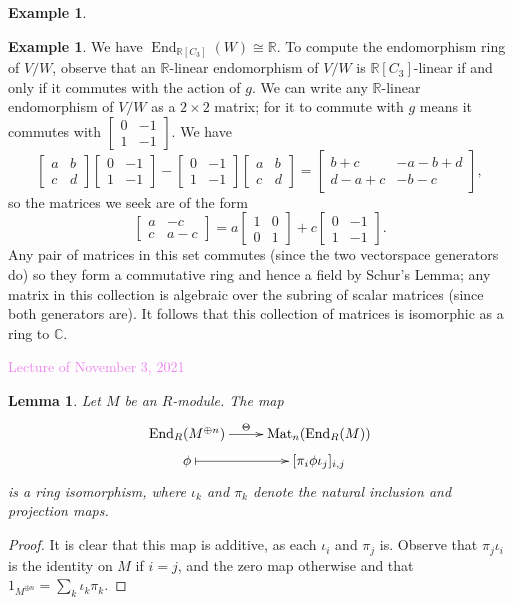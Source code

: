 \documentclass{amsart}[12pt]
\def\End{\operatorname{End}}
\def\Mat{\operatorname{Mat}}
\newcommand{\Nov}[1]{\textcolor{violet}{Lecture of November #1, 2021}}
\newcommand{\R}{{\mathbb{R}}}
\newcommand{\C}{\mathbb{C}}
\numberwithin{equation}{section}
\theoremstyle{plain} %
\newtheorem{lem}[equation]{Lemma}
\theoremstyle{definition}
\newtheorem{ex}[equation]{Example}
\theoremstyle{remark}
\begin{document}
\begin{ex}
\begin{ex}
We have $\End_{\R[C_3]}(W) \cong \R$. To compute the endomorphism ring of $V/W$, observe that an $\R$-linear endomorphism of $V/W$ is $\R[C_3]$-linear if and only if it commutes with the action of $g$. We can write any $\R$-linear endomorphism of $V/W$ as a $2\times 2$ matrix; for it to commute with $g$ means it commutes with $\begin{bmatrix} 0  & -1 \\ 1 & -1\end{bmatrix}$. We have 
\[ \begin{bmatrix} a & b \\ c& d \end{bmatrix} \begin{bmatrix} 0  & -1 \\ 1 & -1\end{bmatrix} - \begin{bmatrix} 0  & -1 \\ 1 & -1\end{bmatrix}  \begin{bmatrix} a & b \\ c& d \end{bmatrix} = \begin{bmatrix} b + c & -a-b+d \\ d -a + c & -b-c \end{bmatrix}, \]
so the matrices we seek are of the form \[\begin{bmatrix} a & -c \\ c & a-c \end{bmatrix}= a \begin{bmatrix} 1 & 0 \\ 0 & 1\end{bmatrix} + c \begin{bmatrix} 0 & -1 \\ 1 & -1\end{bmatrix}. \] Any pair of matrices in this set commutes (since the two vectorspace generators do) so they form a commutative ring and hence a field by Schur's Lemma;  any matrix in this collection is algebraic over the subring of scalar matrices (since both generators are). It follows that this collection of matrices is isomorphic as a ring to $\C$. \end{ex}

\Nov{3}

\begin{lem} Let $M$ be an $R$-module. The map
\[ \xymatrix@R=1mm{ \End_R(M^{\oplus n}) \ar[r]^-{\Theta} & \Mat_n(\End_R(M)) \\
\phi \ar@{|->}[r] & [\pi_i \phi  \iota_j]_{i,j} }\]
is a ring isomorphism, where $\iota_k$ and $\pi_k$ denote the natural inclusion and projection maps.
\end{lem}
\begin{proof}
It is clear that this map is additive, as each $\iota_i$ and $\pi_j$ is. Observe that $\pi_j  \iota_i$ is the identity on $M$ if $i=j$, and the zero map otherwise and that $1_{M^{\oplus n}} = \sum_{k} \iota_k  \pi_k$.


\end{proof}
\end{ex}
\end{document}
